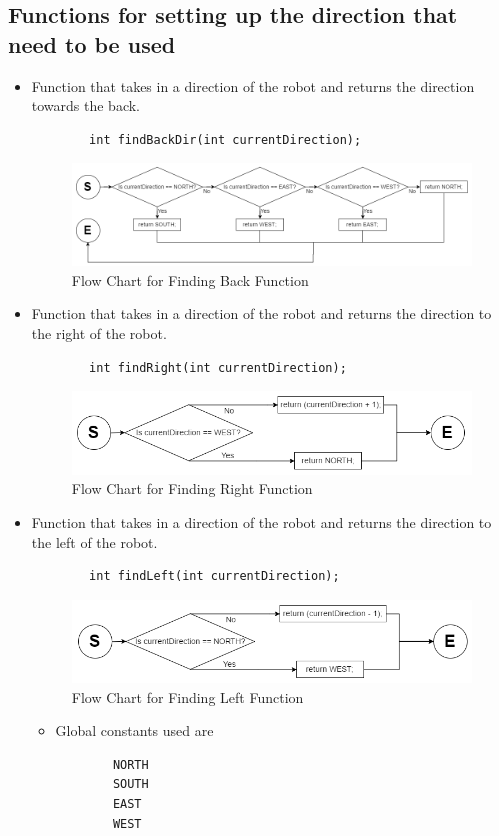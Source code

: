 \documentclass[11pt]{article}
\begin{document}

\subsection{Functions for setting up the direction that need to be used}
\begin{itemize}
\item Function that takes in a direction of the robot and returns the direction towards the back.
	\begin{verbatim}
		int findBackDir(int currentDirection);
	\end{verbatim}
\begin{figure}[htp]
\centering
\includegraphics[scale=0.45]{images/Software_Flowchart/findBackDir.png}
\caption{Flow Chart for Finding Back Function}
\label{}
\end{figure}
\item Function that takes in a direction of the robot and returns the direction to the right of the robot.
	\begin{verbatim}
		int findRight(int currentDirection);
	\end{verbatim}
\begin{figure}[htp]
\centering
\includegraphics[scale=0.47]{images/Software_Flowchart/findRight.png}
\caption{Flow Chart for Finding Right Function}
\label{}
\end{figure}	
\item Function that takes in a direction of the robot and returns the direction to the left of the robot.
	\begin{verbatim}
		int findLeft(int currentDirection);
	\end{verbatim}
\begin{figure}[htp]
\centering
\includegraphics[scale=0.48]{images/Software_Flowchart/findLeft.png}
\caption{Flow Chart for Finding Left Function}
\label{}
\end{figure}
	\begin{itemize}
	\item Global constants used are
	\begin{verbatim}
		NORTH
		SOUTH
		EAST
		WEST
	\end{verbatim}
	\end{itemize}
\end{itemize}
\end{document}
